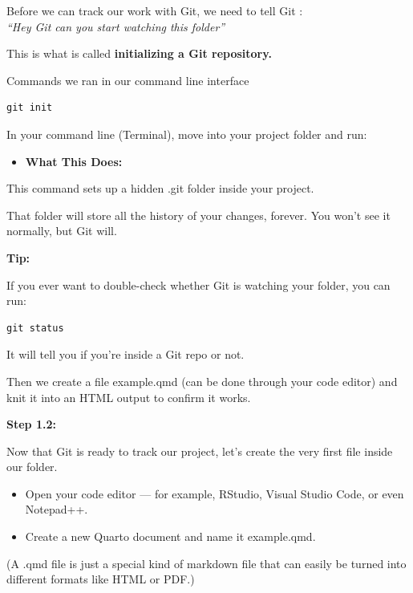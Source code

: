 \documentclass[
  11pt,
  a4paper,
]{article}
\providecommand{\tightlist}{%
  \setlength{\itemsep}{0pt}\setlength{\parskip}{0pt}}\usepackage{longtable,booktabs,array}
\begin{document}
Before we can track our work with Git, we need to tell Git :\\
\emph{``Hey Git can you start watching this folder''}

This is what is called \textbf{initializing a Git repository.}

Commands we ran in our command line interface

\begin{verbatim}
git init
\end{verbatim}

In your command line (Terminal), move into your project folder and run:

\begin{itemize}
\tightlist
\item
  \textbf{What This Does:}
\end{itemize}

This command sets up a hidden .git folder inside your project.

That folder will store all the history of your changes, forever. You
won't see it normally, but Git will.

\textbf{Tip:}

If you ever want to double-check whether Git is watching your folder,
you can run:

\begin{verbatim}
git status
\end{verbatim}

It will tell you if you're inside a Git repo or not.

Then we create a file example.qmd (can be done through your code editor)
and knit it into an HTML output to confirm it works.

\textbf{Step 1.2:}

Now that Git is ready to track our project, let's create the very first
file inside our folder.

\begin{itemize}
\tightlist
\item
  Open your code editor --- for example, RStudio, Visual Studio Code, or
  even Notepad++.
\end{itemize}

\begin{itemize}
\tightlist
\item
  Create a new Quarto document and name it example.qmd.
\end{itemize}

(A .qmd file is just a special kind of markdown file that can easily be
turned into different formats like HTML or PDF.)
\end{document}
